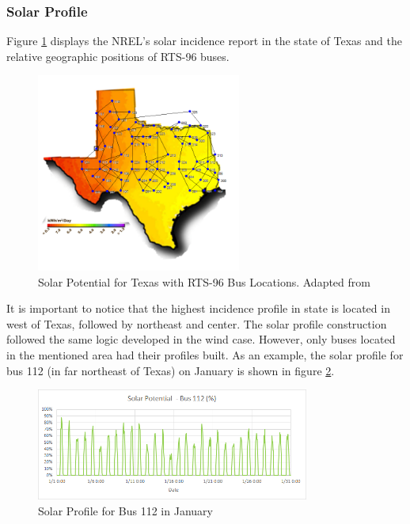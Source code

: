 \documentclass[12pt,LUDisStyle,twosided]{book}
\begin{document}
\subsubsection{Solar Profile}

Figure \ref{fig:texasSolarProfile} displays the NREL's solar incidence report in the state of Texas and the relative geographic positions of RTS-96 buses. 

\begin{figure}[h!] 
	\begin{center}
		\includegraphics[width=0.6\textwidth,keepaspectratio]{texasSolarProfileWithBuses.png}
	  	\caption{Solar Potential for Texas with RTS-96 Bus Locations. Adapted from \cite{texasSolarProfile} }	  				        \label{fig:texasSolarProfile}
	\end{center}
\end{figure}


It is important to notice that the highest incidence profile in state is located in west of Texas, followed by northeast and center. The solar profile construction followed the same logic developed in the wind case. However, only buses located in the mentioned area had their profiles built. As an example, the solar profile for bus 112 (in far northeast of Texas) on January is shown in figure \ref{fig:solarProfileBus112January}.

\begin{figure}[h!] 
	\begin{center}
		\includegraphics[width=0.8\textwidth,keepaspectratio]{solarPotentialBus112.png}
	  	\caption{Solar Profile for Bus 112 in January }
     	\label{fig:solarProfileBus112January}
	\end{center}
\end{figure}
\end{document}
